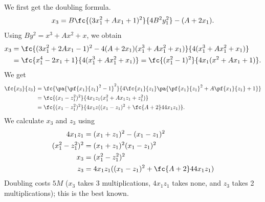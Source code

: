 We first get the doubling formula.
\[
x_3=B\fc{(3x_1^2+Ax_1+1)^2}{4B^2y_1^2}-(A+2x_1).
\]
Using $By^2=x^3+Ax^2+x$, we obtain
\begin{align*}
x_3&=\fc{(3x_1^2+2Ax_1-1)^2 - 4(A+2x_1)(x_1^3+Ax_1^2+x_1)}{4(x_1^3+Ax_1^2+x_1)}\\
&=\fc{x_1^4-2x_1+1}{4(x_1^3+Ax_1^2+x_1)}
=\fc{(x_1^2-1)^2}{4x_1(x^2+Ax_1+1)}.
\end{align*}
We get
\begin{align*}
\fc{x_3}{z_3}&=\fc{\pa{\pf{x_1}{z_1}^2-1}^2}{4\fc{x_1}{z_1}\pa{\pf{x_1}{z_1}^2+A\pf{x_1}{z_1}+1}}\\
&=\fc{(x_1-z_1^2)^2}{4x_1z_1(x_1^2+Ax_1z_1+z_1^2)}\\
&=\fc{(x_1-z_1^2)^2}{4x_1z((x_1-z_1)^2+\fc{A+2}44x_1z_1)}.
\end{align*}
We calculate $x_3$ and $z_3$ using
\begin{align*}
4x_1z_1&=(x_1+z_1)^2-(x_1-z_1)^2\\
(x_1^2-z_1^2)^2&= (x_1+z_1)^2(x_1-z_1)^2\\
x_3&=(x_1^2-z_1^2)^2\\
z_3&=4x_1z_1((x_1-z_1)^2+\fc{A+2}44x_1z_1)\\
\end{align*}
Doubling costs $5M$ ($x_3$ takes 3 multiplications, $4x_1z_1$ takes none, and $z_3$ takes 2 multiplications); this is the best known.

